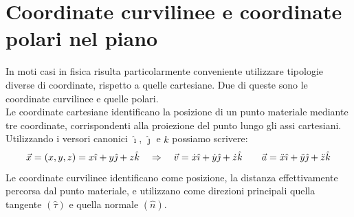 \section{Coordinate curvilinee e coordinate polari nel piano}
In moti casi in fisica risulta particolarmente conveniente utilizzare 
tipologie diverse di coordinate, rispetto a quelle cartesiane. Due di queste sono le coordinate curvilinee e quelle polari.\\
Le coordinate cartesiane identificano la posizione di un punto materiale 
mediante tre coordinate, corrispondenti alla proiezione del punto lungo gli assi cartesiani. Utilizzando i versori canonici $\hat\imath$, $\hat\jmath$ e $\hat k$ possiamo scrivere:
\begin{equation}
    \vec x = \left( x, y, z\right) = x\hat\imath + y\hat\jmath + z\hat k\quad\Rightarrow\quad
    \vec v = \dot x\hat\imath +\dot y\hat\jmath +\dot z\hat k\quad\quad
    \vec a = \ddot x\hat\imath +\ddot y\hat\jmath +\ddot z\hat k
\label{eq:Cartesian}
\end{equation}
Le coordinate curvilinee identificano come posizione, la distanza effettivamente percorsa dal punto materiale, e utilizzano come direzioni principali quella tangente $(\hat\tau)$ e quella normale $(\hat n)$.\\

